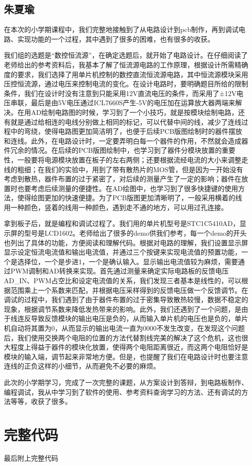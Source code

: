 \documentclass{zjureport}
\begin{document}
        \subsection{朱夏瑜}
        在本次的小学期课程中，我们完整地接触到了从电路设计到pcb制作，再到调试电路、实现功能的一个过程，其中遇到了很多的困难，也有很多的收获。

        我们组的选题是“数控恒流源”，在确定选题后，就开始了电路设计。在仔细阅读了老师给出的参考资料后，我基本了解了恒流源电路的工作原理，根据设计所需精确度的要求，我们选择了用单片机控制的数控直流恒流源电路，其中恒流源模块采用压控恒流源，通过电压来控制电流的变化。在设计电路时，要明确题目所给的限制条件，我们在设计时没有注意到只能采用12V直流电压的条件，而采用了±12V电压串联，最后是由5V电压通过ICL7660S产生-5V的电压加在运算放大器两端来解决。在用AD绘制电路图的时候，学习到了一个小技巧，就是按模块绘制电路，还有就是通过给相连的电线分别做上相同的标记，可以代替中间的线，减少了连线过程中的弯绕，使得电路图更加简洁明了，也便于后续PCB版图绘制时的器件摆放和连线。此外，在电路设计时，一定要弄明白每一个器件的作用，不然就会造成器件冗余的情况。在后续的PCB版图绘制中，也学习到了器件分模块放置的重要性，一般要将电源模块放置在板子的左右两侧；还要根据流经电流的大小来调整走线的粗细；在我们的实验中，用到了带有散热片的MOS管，但是因为一开始没有考虑到散热，器件布置的过于紧密了，对后续的测量产生了一定的影响；器件在放置时也要考虑后续测量的便捷性。在AD绘图中，也学习到了很多快捷键的使用方法，使得绘图更加的快速便捷。为了PCB版图更加清晰明了，一般采用横着的线用一种颜色，竖着的线用一种颜色，遇到走不通的地方，可以用过孔连接。

        拿到板子后，就是编程和调试过程了。我们用的单片机型号是STC1C5410AD，显示屏的型号是LCD1602。老师给出了很多的demo供我们参考，每一个demo的开头也列出了具体的功能，方便阅读和理解代码。根据对电路的理解，我们设置显示屏显示设定恒流电流值和输出电流值，并通过三个按键来实现电流值的预置功能，一个是选择位，一个是步进1，一个是确认输入。显示输出电流值较为麻烦，需要通过PWM调制和AD转换来实现。首先通过测量来确定实际电路板的反馈电压AD_IN、PWM占空比和设定电流值的关系，我们发现三者基本是线性的，可以根据范围乘上一个系数来匹配，并根据电压采样得到的反馈电压做一个反馈调节。在调试的过程中，我们遇到了由于器件布置的过于密集导致散热较慢，数据不稳定的现象，根据调节系数来降低发热带来的影响。此外，我们还遇到了一个问题，是由于线连反导致反馈模块的输出电压是负的，从而输入单片机的电压也是负的，单片机自动将其置为0，从而显示的输出电流一直为0000不发生改变，在发现这个问题后，我们使用交换两个电阻的位置的方法代替割线完美的解决了这个危机，这也很大程度上得益于器件的模块化放置，使得两个电阻距离很近，而这两个电阻恰好是模块的输入端，调节起来非常地方便。但是，也提醒了我们在电路设计时也要注意连线的正负这样的小细节，从而避免不必要的麻烦。

        此次的小学期学习，完成了一次完整的课题，从方案设计到答辩，到电路板制作、编程调试，我从中学习到了软件的使用、参考资料查询学习的方法、还有调试的方法等等，收获了很多。

        \newpage
        \section{完整代码}
        最后附上完整代码
    
    \newpage
\end{document}
